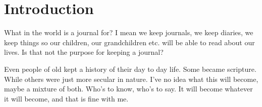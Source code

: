 \section*{Introduction}

What in the world is a journal for? I mean we keep journals, we keep diaries, we keep
things so our children, our grandchildren etc. will be able to read about our lives.
Is that not the purpose for keeping a journal?

Even people of old kept a history of their day to day life. Some became scripture.
While others were just more secular in nature. I've no idea what this will become,
maybe a mixture of both. Who's to know, who's to say. It will become whatever it will
become, and that is fine with me.